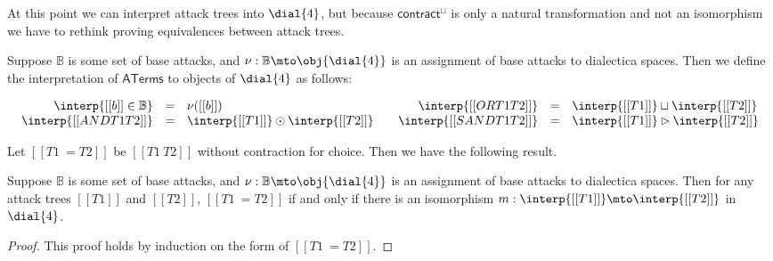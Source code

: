 At this point we can interpret attack trees into $\dial{4}$, but
because $\mathsf{contract}^\sqcup$ is only a natural transformation
and not an isomorphism we have to rethink proving equivalences between
attack trees.
\begin{definition}
  \label{def:interp-aterms-ternary}
  Suppose $\mathbb{B}$ is some set of base attacks, and $\nu :
  \mathbb{B} \mto \obj{\dial{4}}$ is an assignment of base attacks to
  dialectica spaces.  Then we define the interpretation of
  $\mathsf{ATerms}$ to objects of $\dial{4}$ as follows:
  \begin{center}
    \begin{math}
      \setlength{\arraycolsep}{5px}
      \begin{array}{lll}
        \begin{array}{rll}
          \interp{[[b]] \in \mathbb{B}} & = & \nu([[b]])\\
        \interp{[[AND T1 T2]]} & = & \interp{[[T1]]} \odot \interp{[[T2]]}\\
        \end{array}
        &
        \begin{array}{rll}
          \interp{[[OR T1 T2]]} & = & \interp{[[T1]]} \sqcup \interp{[[T2]]}\\
          \interp{[[SAND T1 T2]]} & = & \interp{[[T1]]} \rhd \interp{[[T2]]}\\          
        \end{array}
      \end{array}
    \end{math}
  \end{center}
\end{definition}
Let $[[T1 ~= T2]]$ be $[[T1 ~ T2]]$ without contraction for choice.
Then we have the following result.
\begin{lemma}
  \label{lemma:equivalence_of_attack_trees_lineale}
  Suppose $\mathbb{B}$ is some set of base attacks, and $\nu :
  \mathbb{B} \mto \obj{\dial{4}}$ is an assignment of base attacks to
  dialectica spaces.  Then for any attack trees $[[T1]]$ and $[[T2]]$,
  $[[T1 ~= T2]]$ if and only if there is an isomorphism $m :
  \interp{[[T1]]} \mto \interp{[[T2]]}$ in $\dial{4}$.
\end{lemma}
\begin{proof}
  This proof holds by induction on the form of $[[T1 ~= T2]]$.
\end{proof}

